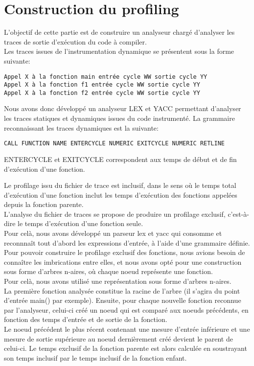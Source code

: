 \section{Construction du profiling}

L'objectif de cette partie est de construire un analyseur chargé d'analyser les traces de sortie d'exécution du code à compiler.\\

Les traces issues de l'instrumentation dynamique se présentent sous la forme suivante:
\begin{verbatim}
Appel X à la fonction main entrée cycle WW sortie cycle YY
Appel X à la fonction f1 entrée cycle WW sortie cycle YY
Appel X à la fonction f2 entrée cycle WW sortie cycle YY
\end{verbatim}

Nous avons donc développé un analyseur LEX et YACC permettant d'analyser les traces statiques et dynamiques issues du code instrumenté.
La grammaire reconnaissant les traces dynamiques est la suivante:
\begin{verbatim}
CALL FUNCTION NAME ENTERCYCLE NUMERIC EXITCYCLE NUMERIC RETLINE
\end{verbatim}

ENTERCYCLE et EXITCYCLE correspondent aux temps de début et de fin d'exécution d'une fonction.

Le profilage issu du fichier de trace est inclusif, dans le sens où le temps total d'exécution d'une fonction inclut les temps d'exécution des fonctions appelées depuis la fonction parente.\\
L'analyse du fichier de traces se propose de produire un profilage exclusif, c'est-à-dire le temps d'exécution d'une fonction seule.\\
Pour celà, nous avons développé un parseur lex et yacc qui consomme et reconnnaît tout d'abord les expressions d'entrée, à l'aide d'une grammaire définie.\\

Pour pouvoir construire le profilage exclusif des fonctions, nous avions besoin de connaître les imbrications entre elles, et nous avons opté pour une construction sous forme d'arbres n-aires, où chaque noeud représente une fonction.\\


Pour celà, nous avons utilisé une représentation sous forme d'arbres n-aires.\\
La première fonction analysée constitue la racine de l'arbre (il s'agira du point d'entrée main() par exemple). Ensuite, pour chaque nouvelle fonction reconnue par l'analyseur, celui-ci créé un noeud qui est comparé aux noeuds précédents, en fonction des temps d'entrée et de sortie de la fonction.\\
Le noeud précédent le plus récent contenant une mesure d'entrée inférieure et une mesure de sortie supérieure au noeud dernièrement créé devient le parent de celui-ci. Le temps exclusif de la fonction parente est alors calculée en soustrayant son temps inclusif par le temps inclusif de la fonction enfant.\\

